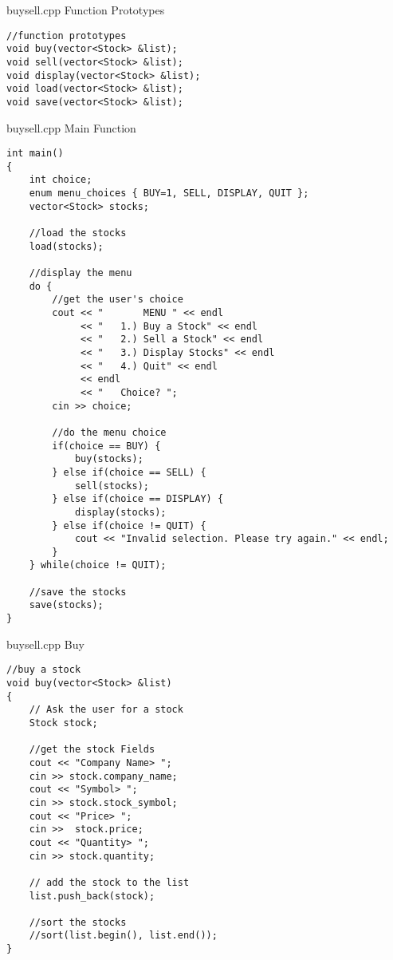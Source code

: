 \documentclass[]{beamer}
\begin{document}
\begin{frame}[fragile]{buysell.cpp Function Prototypes}
\begin{adjustbox}{max totalheight=0.90\textheight}
\begin{BVerbatim}
//function prototypes
void buy(vector<Stock> &list);
void sell(vector<Stock> &list);
void display(vector<Stock> &list);
void load(vector<Stock> &list);
void save(vector<Stock> &list);
\end{BVerbatim}
\end{adjustbox}
\end{frame}


\begin{frame}[fragile]{buysell.cpp Main Function}
\begin{adjustbox}{max totalheight=0.90\textheight}
\begin{BVerbatim}
int main()
{
    int choice;
    enum menu_choices { BUY=1, SELL, DISPLAY, QUIT };
    vector<Stock> stocks;  

    //load the stocks
    load(stocks);
    
    //display the menu
    do {
        //get the user's choice
        cout << "       MENU " << endl
             << "   1.) Buy a Stock" << endl
             << "   2.) Sell a Stock" << endl
             << "   3.) Display Stocks" << endl
             << "   4.) Quit" << endl
             << endl
             << "   Choice? ";
        cin >> choice;

        //do the menu choice
        if(choice == BUY) {
            buy(stocks);
        } else if(choice == SELL) {
            sell(stocks);
        } else if(choice == DISPLAY) {
            display(stocks);
        } else if(choice != QUIT) {
            cout << "Invalid selection. Please try again." << endl;
        }
    } while(choice != QUIT);

    //save the stocks
    save(stocks);
}
\end{BVerbatim}
\end{adjustbox}
\end{frame}


\begin{frame}[fragile]{buysell.cpp Buy}
\begin{adjustbox}{max totalheight=0.90\textheight}
\begin{BVerbatim}
//buy a stock
void buy(vector<Stock> &list)
{
    // Ask the user for a stock
    Stock stock;

    //get the stock Fields
    cout << "Company Name> ";
    cin >> stock.company_name;
    cout << "Symbol> ";
    cin >> stock.stock_symbol;
    cout << "Price> ";
    cin >>  stock.price;
    cout << "Quantity> ";
    cin >> stock.quantity;

    // add the stock to the list
    list.push_back(stock);

    //sort the stocks
    //sort(list.begin(), list.end());
}
\end{BVerbatim}
\end{adjustbox}
\end{frame}
\end{document}
